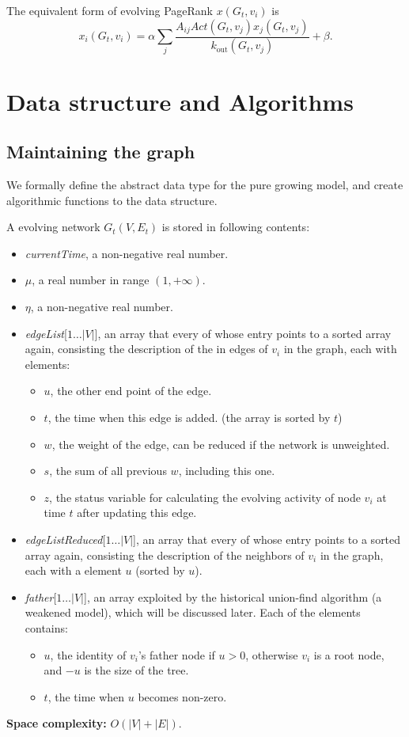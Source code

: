 \documentclass[12pt,abstract=true]{scrartcl}
\numberwithin{equation}{section}
\theoremstyle{definition}   \newtheorem{definition}{Definition}[section]
\theoremstyle{plain}        \newtheorem{theorem}{Theorem}[section]
\theoremstyle{plain}        \newtheorem{observation}{Observation}[section]
\theoremstyle{plain}        \newtheorem{fact}{Fact}[section]
\theoremstyle{plain}        \newtheorem{claim}{Claim}[section]
\theoremstyle{plain}        \newtheorem{lemma}[theorem]{Lemma}
\theoremstyle{plain}        \newtheorem{corollary}[theorem]{Corollary}
\theoremstyle{remark}       \newtheorem{example}{Example}[section]
\theoremstyle{remark}       \newtheorem{remark}{Remark}[section]
\begin{document}
The equivalent form of evolving PageRank $x(G_t,v_i)$ is 
\begin{equation}
x_i(G_t,v_i)=\alpha\sum_j
\frac{A_{ij}\mathit{Act}(G_t,v_j)x_j(G_t,v_j)}{k_{\mathrm{out}}(G_t,v_j)}
+\beta.
\end{equation}

\section{Data structure and Algorithms}
\subsection{Maintaining the graph}
We formally define the abstract data type for the pure growing model, and
create algorithmic functions to the data structure.

A evolving network $G_t(V,E_t)$ is stored in following contents:
\begin{itemize}
\item \textit{currentTime}, a non-negative real number.
\item $\mu$, a real number in range $(1,+\infty)$.
\item $\eta$, a non-negative real number.
\item \textit{edgeList}[$1\dots|V|$], an array that every of
whose entry points to a sorted array again, consisting the description of the
in edges of $v_i$ in the graph, each with elements:
\begin{itemize}
\item $u$, the other end point of the edge.
\item $t$, the time when this edge is added. (the array is sorted by $t$)
\item $w$, the weight of the edge, can be reduced if the network is
unweighted.
\item $s$, the sum of all previous $w$, including this one.
\item $z$, the status variable for calculating the evolving activity of node
$v_i$ at time $t$ after updating this edge.
\end{itemize}

\item \textit{edgeListReduced}[$1\dots|V|$], an array that every of
whose entry points to a sorted array again, consisting the description of the
neighbors of $v_i$ in the graph, each with a element $u$ (sorted by $u$).

\item \textit{father}[$1\dots|V|$], an array exploited by the historical
union-find algorithm\cite{tarjan1975efficiency} (a weakened model), which
will be discussed later. Each of the elements contains:
\begin{itemize}
\item $u$, the identity of $v_i$'s father node if $u>0$, otherwise $v_i$
is a root node, and $-u$ is the size of the tree.
\item $t$, the time when $u$ becomes non-zero.
\end{itemize}

\end{itemize}
\textbf{Space complexity:} $O(|V|+|E|)$.
\end{document}
